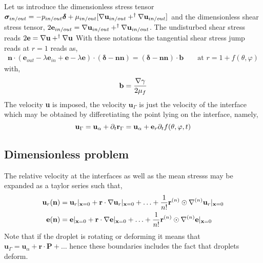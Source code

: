 Let us introduce the dimensionless stress tensor $\bm\sigma_{in/out} = -p_{in/out} \bm\delta + \mu_{in/out}[\mathbf{\nabla} \textbf{u}_{in/out} + ^\dagger \mathbf{\nabla} \textbf{u}_{in/out}]$ and the dimensionless shear stress tensor, $2\textbf{e}_{in/out} = \mathbf{\nabla} \textbf{u}_{in/out} + ^\dagger \mathbf{\nabla} \textbf{u}_{in/out}$. 
The undisturbed shear stress reads  $2\textbf{e} = \mathbf{\nabla} \textbf{u} + ^\dagger \mathbf{\nabla} \textbf{u}$
With these notations the tangential shear stress jump reads at $r = 1$ reads as, 
\begin{align}
    \mathbf{n}\cdot (\textbf{e}_{out} - \lambda \textbf{e}_{in}+\textbf{e} -\lambda\textbf{e})\cdot (\bm\delta - \textbf{nn})
    = (\bm\delta - \textbf{nn})\cdot \textbf{b}
    &&
    \text{ at }
    r = 1 + f(\theta,\varphi)
\end{align}
with, 
\begin{equation}
    \textbf{b}
    =
    \frac{\mathbf{\nabla} \gamma}{2\mu_f}
\end{equation}
The velocity \textbf{u} is imposed, the velocity $\textbf{u}_\Gamma$ is just the velocity of the interface which may be obtained by differetiating the point lying on the interface, namely, 
\begin{equation}
    \textbf{u}_\Gamma
    =
    \textbf{u}_\alpha
    +
    \partial_t \textbf{r}_\Gamma
    =
    \textbf{u}_\alpha
    + 
    \textbf{e}_r\partial_t f(\theta,\varphi,t)
\end{equation}

\subsection*{Dimensionless problem}
The relative velocity at the interfaces as well as the mean stresss may be expanded as a taylor series such that, 
\begin{align*}
    \textbf{u}_r(\textbf{n}) 
    &=  \textbf{u}_r|_{\textbf{x}=0}
    +  \textbf{r} \cdot  \mathbf{\nabla}\textbf{u}_r|_{\textbf{x}=0}
    + \ldots
    +  \frac{1}{n!}\textbf{r}^{(n)} \odot \mathbf{\nabla}^{(n)}\textbf{u}_r|_{\textbf{x}=0}
    \\
     \textbf{e}(\textbf{n}) 
    &=   \textbf{e}|_{\textbf{x}=0}
    + \textbf{r} \cdot  \mathbf{\nabla} \textbf{e}|_{\textbf{x}=0}
    + \ldots
    + \frac{1}{n!}\textbf{r}^{(n)} \odot  \mathbf{\nabla}^{(n)} \textbf{e}|_{\textbf{x}=0}
\end{align*}
Note that if the droplet is rotating or deforming it means that $\textbf{u}_\Gamma = \textbf{u}_\alpha + \textbf{r}\cdot \textbf{P}+ \ldots$ hence these boundaries includes the fact that droplets deform. 

